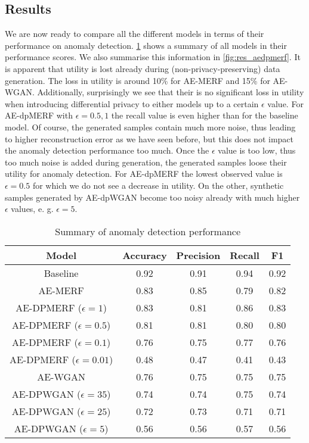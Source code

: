 \subsection{Results}
We are now ready to compare all the different models in terms of their performance on anomaly detection. \cref{tab:results} shows a summary of all models in their performance scores. We also summarise this information in \cref{fig:res_aedpmerf}. It is apparent that utility is lost already during (non-privacy-preserving) data generation. The loss in utility is around 10\% for AE-MERF and 15\% for AE-WGAN. Additionally, surprisingly we see that their is no significant loss in utility when introducing differential privacy to either models up to a certain $\epsilon$ value. For AE-dpMERF with $\epsilon=0.5, 1$ the recall value is even higher than for the baseline model. Of course, the generated samples contain much more noise, thus leading to higher reconstruction error as we have seen before, but this does not impact the anomaly detection performance too much. Once the $\epsilon$ value is too low, thus too much noise is added during generation, the generated samples loose their utility for anomaly detection. For AE-dpMERF the lowest observed value is $\epsilon=0.5$ for which we do not see a decrease in utility. On the other, synthetic samples generated by AE-dpWGAN become too noisy already with much higher $\epsilon$ values, e. g. $\epsilon=5$. 
\begin{table}[h]
    \centering
    \begin{tabular}{c||c|c|c|c}
        \textbf{Model} & \textbf{Accuracy} & \textbf{Precision} & \textbf{Recall} & \textbf{F1} \\ 
        \hline 
        \hline

        Baseline & 0.92 & 0.91 & 0.94 & 0.92 \vspace{0.5cm}\\
        \hline

        AE-MERF & 0.83 & 0.85 & 0.79 & 0.82 \\
        \hline
        AE-DPMERF ($\epsilon=1$) & 0.83 & 0.81 & 0.86 & 0.83 \\
        \hline
        AE-DPMERF ($\epsilon=0.5$) & 0.81 & 0.81 & 0.80 & 0.80 \\
        \hline
        AE-DPMERF ($\epsilon=0.1$) & 0.76 & 0.75 & 0.77 & 0.76\\
        \hline
        AE-DPMERF ($\epsilon=0.01$) & 0.48 & 0.47 & 0.41 & 0.43 \vspace{0.5cm}\\
        \hline

        AE-WGAN & 0.76 & 0.75 & 0.75 & 0.75 \\
        \hline
        AE-DPWGAN ($\epsilon=35$) & 0.74 & 0.74 & 0.75 & 0.74 \\
        \hline
        AE-DPWGAN ($\epsilon=25$) & 0.72 & 0.73 & 0.71 & 0.71 \\
        \hline
        AE-DPWGAN ($\epsilon=5$) & 0.56 & 0.56 & 0.57 & 0.56\\

    \end{tabular}
    \caption{Summary of anomaly detection performance}
    \label{tab:results}
\end{table}

